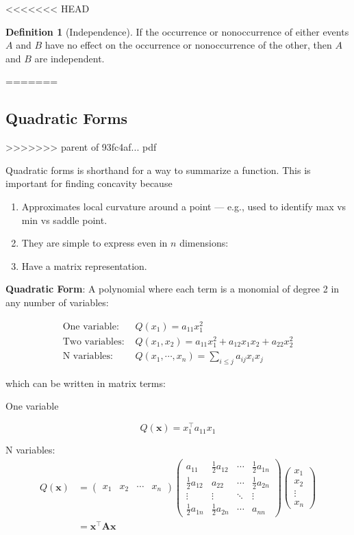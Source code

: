 \documentclass[]{book}
\providecommand{\tightlist}{%
  \setlength{\itemsep}{0pt}\setlength{\parskip}{0pt}}
\theoremstyle{definition}
\newtheorem{definition}{Definition}[chapter]
\theoremstyle{definition}
\theoremstyle{definition}
\theoremstyle{remark}
\begin{document}
<<<<<<< HEAD
\begin{definition}[Independence]
\protect\hypertarget{def:unnamed-chunk-70}{}{\label{def:unnamed-chunk-70} {} } If the occurrence or nonoccurrence of either events \(A\) and \(B\) have no effect on the occurrence or nonoccurrence of the other, then \(A\) and \(B\) are independent.
\end{definition}
=======
\hypertarget{quadratic-forms}{%
\subsection*{Quadratic Forms}\label{quadratic-forms}}
>>>>>>> parent of 93fc4af... pdf

Quadratic forms is shorthand for a way to summarize a function. This is important for finding concavity because

\begin{enumerate}
\def\labelenumi{\arabic{enumi}.}
\tightlist
\item
  Approximates local curvature around a point --- e.g., used to
  identify max vs min vs saddle point.
\item
  They are simple to express even in \(n\) dimensions:
\item
  Have a matrix representation.
\end{enumerate}

\textbf{Quadratic Form}: A polynomial where each term is a monomial
of degree 2 in any number of variables:

\begin{align*}
\text{One variable: }& Q(x_1) = a_{11}x_1^2\\
\text{Two variables: }& Q(x_1,x_2) = a_{11}x_1^2 + a_{12}x_1x_2 + a_{22}x_2^2\\
\text{N variables: }& Q(x_1,\cdots,x_n)=\sum\limits_{i\le j} a_{ij}x_i x_j
\end{align*}

which can be written in matrix terms:

One variable

\[Q(\mathbf{x}) = x_1^\top a_{11} x_1\]

N variables:
\begin{align*}
Q(\mathbf{x}) &=\begin{pmatrix} x_1 & x_2 & \cdots & x_n \end{pmatrix}\begin{pmatrix}
a_{11}&\frac{1}{2}a_{12}&\cdots&\frac{1}{2}a_{1n}\\
\frac{1}{2}a_{12}&a_{22}&\cdots&\frac{1}{2}a_{2n}\\
\vdots&\vdots&\ddots&\vdots\\
\frac{1}{2}a_{1n}&\frac{1}{2}a_{2n}&\cdots&a_{nn}
\end{pmatrix}
\begin{pmatrix} x_1\\x_2\\\vdots\\x_n\end{pmatrix}\\
&= \mathbf{x}^\top\mathbf{Ax}
\end{align*}
\end{document}
